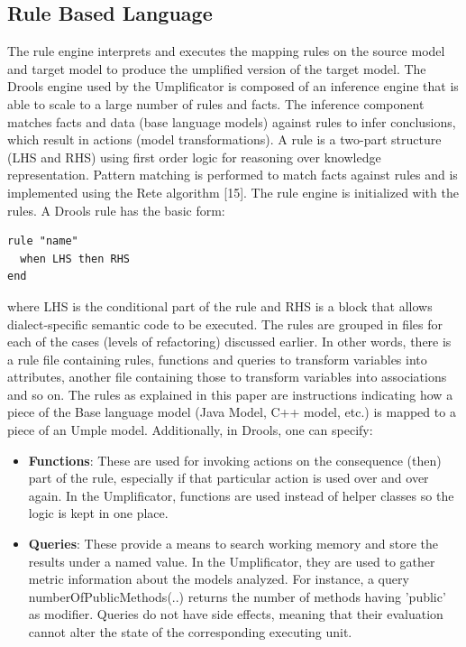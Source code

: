\subsection{Rule Based Language}
The rule engine interprets and executes the mapping rules on the source model and target model to produce the umplified version of the target model.
The Drools engine used by the Umplificator is composed of an inference engine that is able to scale to a large number of rules and facts.  The inference component matches facts and data (base language models) against rules to infer conclusions, which result in actions (model transformations). A rule is a two-part structure (LHS and RHS) using first order logic for reasoning over knowledge representation. Pattern matching is performed to match facts against rules and is implemented using the Rete algorithm [15]. The rule engine is initialized with the rules. A Drools rule has the basic form: 

\begin{lstlisting}[language={drools},label={lst:drools}, caption=Basic rule in Drools] 
rule "name" 
  when LHS then RHS
end
\end{lstlisting}


where LHS is the conditional part of the rule and RHS is a block that allows dialect-specific semantic code to be executed. 
The rules are grouped in files for each of the cases (levels of refactoring) discussed earlier. In other words, there is a rule file containing rules, functions and queries to transform variables into attributes, another file containing those to transform variables into associations and so on. 
The rules as explained in this paper are instructions indicating how a piece of the Base language model (Java Model, C++ model, etc.) is mapped to a piece of an Umple model. Additionally, in Drools, one can specify:
\begin{itemize}
\item \textbf{Functions}: These are used for invoking actions on the consequence (then) part of the rule, especially if that particular action is used over and over again. In the Umplificator, functions are used instead of helper classes so the logic is kept in one place.
\item \textbf{Queries}: These provide a means to search working memory and store the results under a named value. In the Umplificator, they are used to gather metric information about the models analyzed. For instance, a query numberOfPublicMethods(..) returns the number of methods having 'public' as modifier. Queries do not have side effects, meaning that their evaluation cannot alter the state of the corresponding executing unit. 
\end{itemize}

